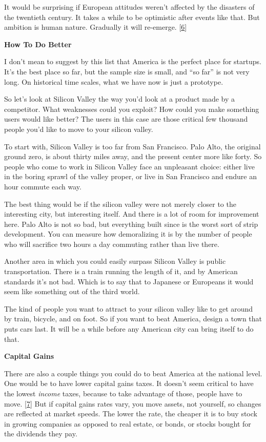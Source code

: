 It would be surprising if European attitudes weren't affected by the
disasters of the twentieth century. It takes a while to be optimistic
after events like that. But ambition is human nature. Gradually it will
re-emerge. {[}\hyperref[f6n]{6}{]}

\textbf{How To Do Better}

I don't mean to suggest by this list that America is the perfect place
for startups. It's the best place so far, but the sample size is small,
and ``so far'' is not very long. On historical time scales, what we have
now is just a prototype.

So let's look at Silicon Valley the way you'd look at a product made by
a competitor. What weaknesses could you exploit? How could you make
something users would like better? The users in this case are those
critical few thousand people you'd like to move to your silicon valley.

To start with, Silicon Valley is too far from San Francisco. Palo Alto,
the original ground zero, is about thirty miles away, and the present
center more like forty. So people who come to work in Silicon Valley
face an unpleasant choice: either live in the boring sprawl of the
valley proper, or live in San Francisco and endure an hour commute each
way.

The best thing would be if the silicon valley were not merely closer to
the interesting city, but interesting itself. And there is a lot of room
for improvement here. Palo Alto is not so bad, but everything built
since is the worst sort of strip development. You can measure how
demoralizing it is by the number of people who will sacrifice two hours
a day commuting rather than live there.

Another area in which you could easily surpass Silicon Valley is public
transportation. There is a train running the length of it, and by
American standards it's not bad. Which is to say that to Japanese or
Europeans it would seem like something out of the third world.

The kind of people you want to attract to your silicon valley like to
get around by train, bicycle, and on foot. So if you want to beat
America, design a town that puts cars last. It will be a while before
any American city can bring itself to do that.

\textbf{Capital Gains}

There are also a couple things you could do to beat America at the
national level. One would be to have lower capital gains taxes. It
doesn't seem critical to have the lowest \emph{income} taxes, because to
take advantage of those, people have to move. {[}\hyperref[f7n]{7}{]}
But if capital gains rates vary, you move assets, not yourself, so
changes are reflected at market speeds. The lower the rate, the cheaper
it is to buy stock in growing companies as opposed to real estate, or
bonds, or stocks bought for the dividends they pay.

